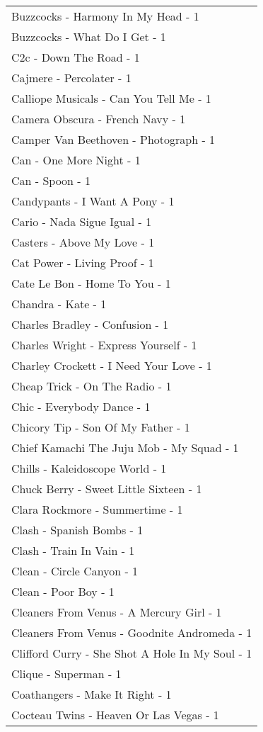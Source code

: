 \documentclass[
]{article}
\begin{document}
\begin{longtable}{l}
Buzzcocks - Harmony In My Head - 1 \\ 
Buzzcocks - What Do I Get - 1 \\ 
C2c - Down The Road - 1 \\ 
Cajmere - Percolater - 1 \\ 
Calliope Musicals - Can You Tell Me - 1 \\ 
Camera Obscura - French Navy - 1 \\ 
Camper Van Beethoven - Photograph - 1 \\ 
Can - One More Night - 1 \\ 
Can - Spoon - 1 \\ 
Candypants - I Want A Pony - 1 \\ 
Cario - Nada Sigue Igual - 1 \\ 
Casters - Above My Love - 1 \\ 
Cat Power - Living Proof - 1 \\ 
Cate Le Bon - Home To You - 1 \\ 
Chandra - Kate - 1 \\ 
Charles Bradley - Confusion - 1 \\ 
Charles Wright - Express Yourself - 1 \\ 
Charley Crockett - I Need Your Love - 1 \\ 
Cheap Trick - On The Radio - 1 \\ 
Chic - Everybody Dance - 1 \\ 
Chicory Tip - Son Of My Father - 1 \\ 
Chief Kamachi The Juju Mob - My Squad - 1 \\ 
Chills - Kaleidoscope World - 1 \\ 
Chuck Berry - Sweet Little Sixteen - 1 \\ 
Clara Rockmore - Summertime - 1 \\ 
Clash - Spanish Bombs - 1 \\ 
Clash - Train In Vain - 1 \\ 
Clean - Circle Canyon - 1 \\ 
Clean - Poor Boy - 1 \\ 
Cleaners From Venus - A Mercury Girl - 1 \\ 
Cleaners From Venus - Goodnite Andromeda - 1 \\ 
Clifford Curry - She Shot A Hole In My Soul - 1 \\ 
Clique - Superman - 1 \\ 
Coathangers - Make It Right - 1 \\ 
Cocteau Twins - Heaven Or Las Vegas - 1 \\ 

\end{longtable}
\end{document}
